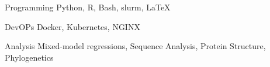 

\begin{cvskills}

  \cvskill
    {Programming}
	{Python, R, Bash, slurm, LaTeX}

  \cvskill
    {DevOPs}
	{Docker, Kubernetes, NGINX}

  \cvskill
    {Analysis}
	{Mixed-model regressions, Sequence Analysis, Protein Structure, Phylogenetics}

\end{cvskills}
